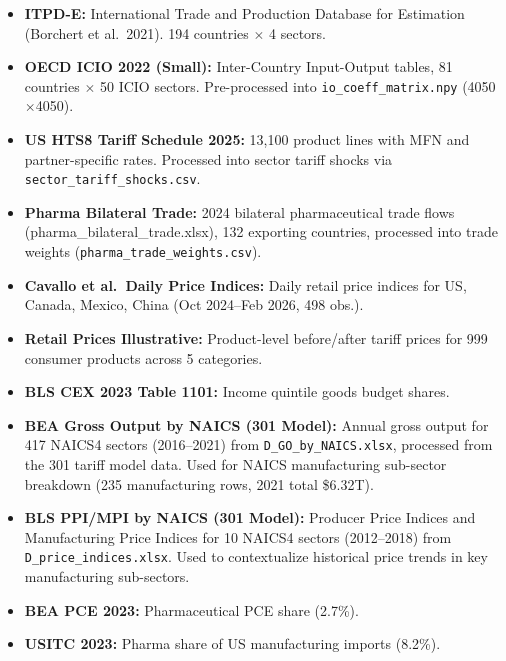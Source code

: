 \documentclass[12pt]{article}
\begin{document}
\begin{itemize}
    \item \textbf{ITPD-E:} International Trade and Production Database for
    Estimation (Borchert et al.\ 2021). 194 countries $\times$ 4 sectors.

    \item \textbf{OECD ICIO 2022 (Small):} Inter-Country Input-Output tables,
    81 countries $\times$ 50 ICIO sectors. Pre-processed into
    \texttt{io\_coeff\_matrix.npy} (4050$\times$4050).

    \item \textbf{US HTS8 Tariff Schedule 2025:} 13,100 product lines with
    MFN and partner-specific rates. Processed into sector tariff shocks
    via \texttt{sector\_tariff\_shocks.csv}.

    \item \textbf{Pharma Bilateral Trade:} 2024 bilateral pharmaceutical trade
    flows (pharma\_bilateral\_trade.xlsx), 132 exporting countries, processed
    into trade weights (\texttt{pharma\_trade\_weights.csv}).

    \item \textbf{Cavallo et al.\ Daily Price Indices:} Daily retail price
    indices for US, Canada, Mexico, China (Oct 2024--Feb 2026, 498 obs.).

    \item \textbf{Retail Prices Illustrative:} Product-level before/after
    tariff prices for 999 consumer products across 5 categories.

    \item \textbf{BLS CEX 2023 Table 1101:} Income quintile goods budget shares.

    \item \textbf{BEA Gross Output by NAICS (301 Model):} Annual gross output
    for 417 NAICS4 sectors (2016--2021) from \texttt{D\_GO\_by\_NAICS.xlsx},
    processed from the 301 tariff model data. Used for NAICS manufacturing
    sub-sector breakdown (235 manufacturing rows, 2021 total \$6.32T).

    \item \textbf{BLS PPI/MPI by NAICS (301 Model):} Producer Price Indices
    and Manufacturing Price Indices for 10 NAICS4 sectors (2012--2018) from
    \texttt{D\_price\_indices.xlsx}. Used to contextualize historical price
    trends in key manufacturing sub-sectors.

    \item \textbf{BEA PCE 2023:} Pharmaceutical PCE share (2.7\%).

    \item \textbf{USITC 2023:} Pharma share of US manufacturing imports (8.2\%).
\end{itemize}
\end{document}
